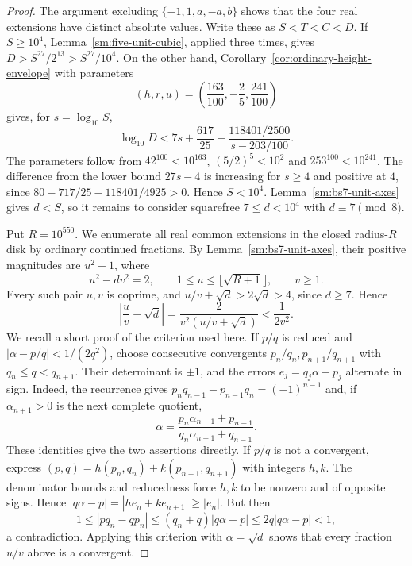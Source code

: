 \documentclass[12pt]{article}
\numberwithin{equation}{section}
\begin{document}
\begin{proof}
The argument excluding $\{-1,1,a,-a,b\}$ shows that the four real extensions have distinct absolute values. Write these as $S<T<C<D$. If $S\ge10^4$, Lemma~\ref{sm:five-unit-cubic}, applied three times, gives $D>S^{27}/2^{13}>S^{27}/10^4$. On the other hand, Corollary~\ref{cor:ordinary-height-envelope} with parameters
\[
 (h,r,u)=\left(\frac{163}{100},-\frac25,\frac{241}{100}\right)
\]
gives, for $s=\log_{10}S$,
\[
 \log_{10}D<7s+\frac{617}{25}
       +\frac{118401/2500}{s-203/100}.
\]
The parameters follow from $42^{100}<10^{163}$, $(5/2)^5<10^2$ and $253^{100}<10^{241}$. The difference from the lower bound $27s-4$ is increasing for $s\ge4$ and positive at $4$, since
$80-717/25-118401/4925>0$. Hence $S<10^4$.
Lemma~\ref{sm:bs7-unit-axes} gives $d<S$, so it remains to consider squarefree $7\le d<10^4$ with $d\equiv7\pmod8$.

Put $R=10^{550}$. We enumerate all real common extensions in the closed radius-$R$ disk by ordinary continued fractions. By Lemma~\ref{sm:bs7-unit-axes}, their positive magnitudes are $u^2-1$, where
\begin{equation*}
 u^2-dv^2=2,\qquad
 1\le u\le\lfloor\sqrt{R+1}\rfloor,\qquad v\ge1.
\end{equation*}
Every such pair $u,v$ is coprime, and
$u/v+\sqrt d>2\sqrt d>4$, since $d\ge7$. Hence
\begin{equation*}
 \left|\frac uv-\sqrt d\right|
 =\frac{2}{v^2(u/v+\sqrt d)}<\frac1{2v^2}.
\end{equation*}
We recall a short proof of the criterion used here. If $p/q$ is reduced
and $|\alpha-p/q|<1/(2q^2)$, choose consecutive convergents
$p_n/q_n,p_{n+1}/q_{n+1}$ with $q_n\le q<q_{n+1}$.
Their determinant is $\pm1$, and the errors
$e_j=q_j\alpha-p_j$ alternate in sign. Indeed, the recurrence gives
$p_nq_{n-1}-p_{n-1}q_n=(-1)^{n-1}$ and, if
$\alpha_{n+1}>0$ is the next complete quotient,
\[
 \alpha=\frac{p_n\alpha_{n+1}+p_{n-1}}
 {q_n\alpha_{n+1}+q_{n-1}}.
\]
These identities give the two assertions directly. If $p/q$ is not a convergent, express
$(p,q)=h(p_n,q_n)+k(p_{n+1},q_{n+1})$ with integers $h,k$.
The denominator bounds and reducedness force $h,k$ to be nonzero
and of opposite signs. Hence
$|q\alpha-p|=|h e_n+k e_{n+1}|\ge|e_n|$. But then
\[
 1\le|p q_n-q p_n|
 \le(q_n+q)|q\alpha-p|\le2q|q\alpha-p|<1,
\]
a contradiction. Applying this criterion with $\alpha=\sqrt d$
shows that every fraction $u/v$ above is a convergent.


\end{proof}
\end{document}
